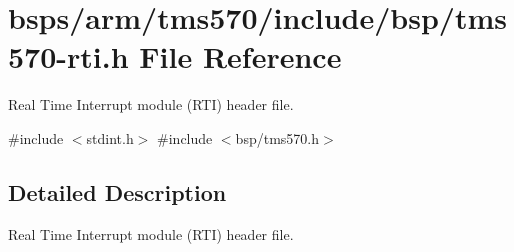\hypertarget{tms570-rti_8h}{}\section{bsps/arm/tms570/include/bsp/tms570-\/rti.h File Reference}
\label{tms570-rti_8h}


Real Time Interrupt module (R\+TI) header file.  


{\ttfamily \#include $<$stdint.\+h$>$}\newline
{\ttfamily \#include $<$bsp/tms570.\+h$>$}\newline


\subsection{Detailed Description}
Real Time Interrupt module (R\+TI) header file. 

